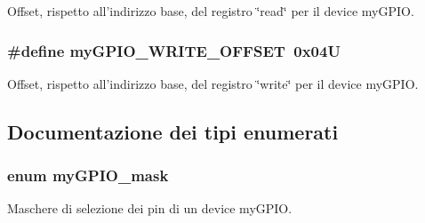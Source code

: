 Offset, rispetto all'indirizzo base, del registro \char`\"{}read\char`\"{} per il device my\+G\+P\+I\+O. 

\hypertarget{group__bare-metal_ga2e45778b6ca9ce6f5768b3f7a4557ce1}{
\subsubsection[{my\+G\+P\+I\+O\+\_\+\+W\+R\+I\+T\+E\+\_\+\+O\+F\+F\+S\+E\+T}]{\setlength{\rightskip}{0pt plus 5cm}\#define my\+G\+P\+I\+O\+\_\+\+W\+R\+I\+T\+E\+\_\+\+O\+F\+F\+S\+E\+T~0x04\+U}}\label{group__bare-metal_ga2e45778b6ca9ce6f5768b3f7a4557ce1}


Offset, rispetto all'indirizzo base, del registro \char`\"{}write\char`\"{} per il device my\+G\+P\+I\+O. 



\subsection{Documentazione dei tipi enumerati}
\hypertarget{group__bare-metal_ga402a0d20afc0cb7c25554b8b023f4253}{
\subsubsection[{my\+G\+P\+I\+O\+\_\+mask}]{\setlength{\rightskip}{0pt plus 5cm}enum {\bf my\+G\+P\+I\+O\+\_\+mask}}}\label{group__bare-metal_ga402a0d20afc0cb7c25554b8b023f4253}


Maschere di selezione dei pin di un device my\+G\+P\+I\+O. 

